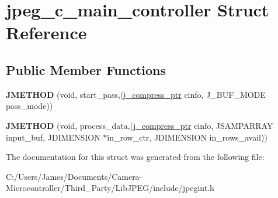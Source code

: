 \hypertarget{structjpeg__c__main__controller}{}\section{jpeg\+\_\+c\+\_\+main\+\_\+controller Struct Reference}
\label{structjpeg__c__main__controller}
\subsection*{Public Member Functions}
\begin{DoxyCompactItemize}
\item 
\mbox{\label{structjpeg__c__main__controller_ad56be8c40b98dd5bb131e6b98cbd75f4}} 
{\bfseries J\+M\+E\+T\+H\+OD} (void, start\+\_\+pass,(\hyperlink{structjpeg__compress__struct}{j\+\_\+compress\+\_\+ptr} cinfo, J\+\_\+\+B\+U\+F\+\_\+\+M\+O\+DE pass\+\_\+mode))
\item 
\mbox{\label{structjpeg__c__main__controller_a3c3bd0bb811ff18f556368e0ecc3c011}} 
{\bfseries J\+M\+E\+T\+H\+OD} (void, process\+\_\+data,(\hyperlink{structjpeg__compress__struct}{j\+\_\+compress\+\_\+ptr} cinfo, J\+S\+A\+M\+P\+A\+R\+R\+AY input\+\_\+buf, J\+D\+I\+M\+E\+N\+S\+I\+ON $\ast$in\+\_\+row\+\_\+ctr, J\+D\+I\+M\+E\+N\+S\+I\+ON in\+\_\+rows\+\_\+avail))
\end{DoxyCompactItemize}


The documentation for this struct was generated from the following file\+:\begin{DoxyCompactItemize}
\item 
C\+:/\+Users/\+James/\+Documents/\+Camera-\/\+Microcontroller/\+Third\+\_\+\+Party/\+Lib\+J\+P\+E\+G/include/jpegint.\+h\end{DoxyCompactItemize}
